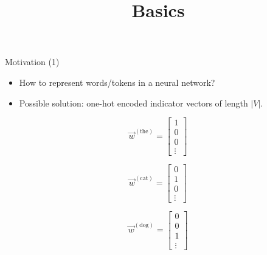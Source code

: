 



\newcommand{\titlefigure}{figure/linear-relationships.png}
\newcommand{\learninggoals}{
\item Understand what word embeddings are
\item Learn the main methods for creating them}

\title{Basics}
\date{}




\begin{vbframe}{Motivation (1)}

\vfill

\begin{itemize}
	\item How to represent words/tokens in a neural network?
	\item Possible solution: one-hot encoded indicator vectors of length $|V|$.
\end{itemize}

\begin{center}
\begin{minipage}{.2\textwidth}
	\[\vec w^{({\text{the}})} =
	\begin{bmatrix}
	1 \\ 0 \\ 0 \\ \vdots
	\end{bmatrix}
	\]
\end{minipage}
\begin{minipage}{.2\textwidth}
	\[\vec w^{({\text{cat}})} =
	\begin{bmatrix}
	0 \\ 1 \\ 0 \\ \vdots
	\end{bmatrix}
	\]
\end{minipage}
\begin{minipage}{.2\textwidth}
\[\vec w^{({\text{dog}})} =
\begin{bmatrix}
0 \\ 0 \\ 1 \\ \vdots
\end{bmatrix}
\]
\end{minipage}
\end{center}


\end{vbframe}
